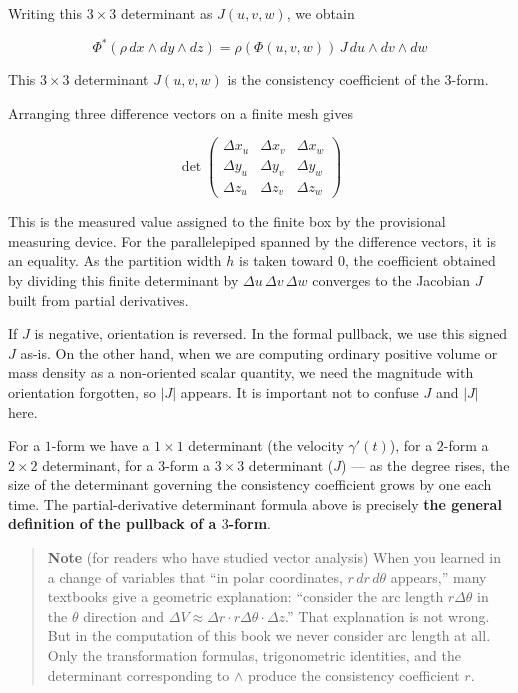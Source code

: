 Writing this \(3 \times 3\) determinant as \(J(u,v,w)\), we obtain

\[\Phi^*(\rho\,dx \wedge dy \wedge dz) = \rho(\Phi(u,v,w))\,J\,du \wedge dv \wedge dw\]

This \(3\times3\) determinant \(J(u,v,w)\) is the consistency
coefficient of the \(3\)-form.

Arranging three difference vectors on a finite mesh gives

\[\det\!\begin{pmatrix}
\Delta x_u & \Delta x_v & \Delta x_w \\[2pt]
\Delta y_u & \Delta y_v & \Delta y_w \\[2pt]
\Delta z_u & \Delta z_v & \Delta z_w
\end{pmatrix}\]

This is the measured value assigned to the finite box by the provisional
measuring device. For the parallelepiped spanned by the difference
vectors, it is an equality. As the partition width \(h\) is taken toward
\(0\), the coefficient obtained by dividing this finite determinant by
\(\Delta u\,\Delta v\,\Delta w\) converges to the Jacobian \(J\) built
from partial derivatives.

If \(J\) is negative, orientation is reversed. In the formal pullback,
we use this signed \(J\) as-is. On the other hand, when we are computing
ordinary positive volume or mass density as a non-oriented scalar
quantity, we need the magnitude with orientation forgotten, so \(|J|\)
appears. It is important not to confuse \(J\) and \(|J|\) here.

For a \(1\)-form we have a \(1 \times 1\) determinant (the velocity
\(\gamma'(t)\)), for a \(2\)-form a \(2 \times 2\) determinant, for a
\(3\)-form a \(3 \times 3\) determinant (\(J\)) --- as the degree rises,
the size of the determinant governing the consistency coefficient grows
by one each time. The partial-derivative determinant formula above is
precisely \textbf{the general definition of the pullback of a $3$-form}.

\begin{quote}
\textbf{Note} (for readers who have studied vector analysis) When you
learned in a change of variables that ``in polar coordinates,
\(r\,dr\,d\theta\) appears,'' many textbooks give a geometric
explanation: ``consider the arc length \(r\Delta\theta\) in the
\(\theta\) direction and
\(\Delta V \approx \Delta r \cdot r\Delta\theta \cdot \Delta z\).'' That
explanation is not wrong. But in the computation of this book we never
consider arc length at all. Only the transformation formulas,
trigonometric identities, and the determinant corresponding to
\(\wedge\) produce the consistency coefficient \(r\).
\end{quote}

